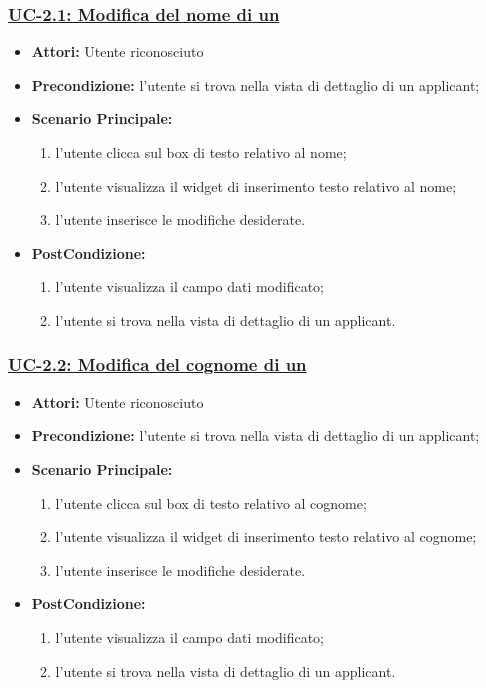 \subsubsection{\underline{UC-2.1: Modifica del nome di un \applicant}}
\begin{itemize}
	\item \textbf{Attori:} Utente riconosciuto
	\item \textbf{Precondizione:}  l'utente si trova nella vista di dettaglio di un applicant;
	\item \textbf{Scenario Principale:}
	\begin{enumerate}
		\item l'utente clicca sul box di testo relativo al nome;
		\item l'utente visualizza il  widget di inserimento testo relativo al nome;
		\item l'utente inserisce le modifiche desiderate.
	\end{enumerate}
	\item \textbf{PostCondizione:} 
	\begin{enumerate}
		\item l'utente visualizza il campo dati modificato;
		\item l'utente si trova nella vista di dettaglio di un applicant.
	\end{enumerate}
	
\end{itemize}

\subsubsection{\underline{UC-2.2: Modifica del cognome di un \applicant}}
\begin{itemize}
	\item \textbf{Attori:} Utente riconosciuto
	\item \textbf{Precondizione:}  l'utente si trova nella vista di dettaglio di un applicant;
	\item \textbf{Scenario Principale:}
	\begin{enumerate}
		\item l'utente clicca sul box di testo relativo al cognome;
		\item l'utente visualizza il  widget di inserimento testo relativo al cognome;
		\item l'utente inserisce le modifiche desiderate.
	\end{enumerate}
	\item \textbf{PostCondizione:} 
	\begin{enumerate}
		\item l'utente visualizza il campo dati modificato;
		\item l'utente si trova nella vista di dettaglio di un applicant.
	\end{enumerate}
	
\end{itemize}

